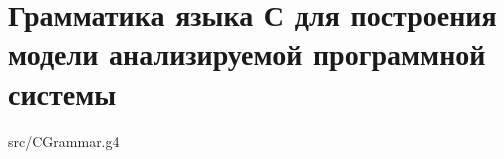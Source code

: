 \chapter{Грамматика языка С для построения модели анализируемой программной
системы}
\label{sec:c_grammar}


{src/CGrammar.g4}
